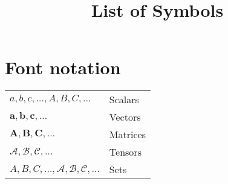 \documentclass{article}
\begin{document}
\title{List of Symbols}
\maketitle

\section{Font notation}
\begin{table}[htbp]
\begin{tabular}{ll}
  $a,b,c, \dots, A, B, C, \dots$ & Scalars \\
  $\mathbf{a}, \mathbf{b}, \mathbf{c}, \dots$ & Vectors \\
  $\mathbf{A}, \mathbf{B}, \mathbf{C}, \dots$ & Matrices \\
  $\bm{\mathcal{A}}, \bm{\mathcal{B}}, \bm{\mathcal{C}}, \dots$ & Tensors \\
  $A, B, C, \dots, \mathcal{A}, \mathcal{B}, \mathcal{C}, \dots$ &  Sets\\
\end{tabular}
\end{table}
\end{document}
